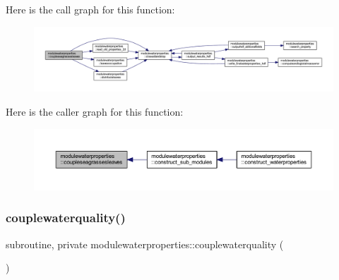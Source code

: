 Here is the call graph for this function\+:\nopagebreak
\begin{figure}[H]
\begin{center}
\leavevmode
\includegraphics[width=350pt]{namespacemodulewaterproperties_ad4fbcdc5c8f0cd8982dbe65a88f54ab8_cgraph}
\end{center}
\end{figure}
Here is the caller graph for this function\+:\nopagebreak
\begin{figure}[H]
\begin{center}
\leavevmode
\includegraphics[width=350pt]{namespacemodulewaterproperties_ad4fbcdc5c8f0cd8982dbe65a88f54ab8_icgraph}
\end{center}
\end{figure}
\mbox{\label{namespacemodulewaterproperties_a2f489eed4fdde73d4aa3ecc3ac0f1ced}} 
\subsubsection{\texorpdfstring{couplewaterquality()}{couplewaterquality()}}
{\footnotesize\ttfamily subroutine, private modulewaterproperties\+::couplewaterquality (\begin{DoxyParamCaption}{ }\end{DoxyParamCaption})\hspace{0.3cm}{\ttfamily [private]}}

